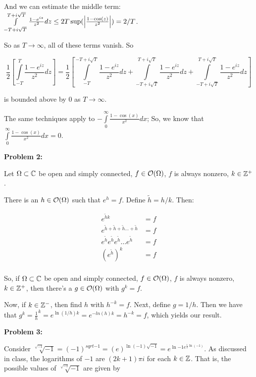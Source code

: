 \documentclass[a4paper,12pt]{article}
\begin{document}
And we can estimate the middle term: $\int\limits_{-T+i\sqrt{T}}^{T+i\sqrt{T}} \frac{1-e^{iz}}{z^2} dz \leq 2T \sup(\left\lvert \frac{1-\cos(z)}{z^2} \right\rvert) = 2/T$.

So as $T \to \infty$, all of these terms vanish. So 

\begin{displaymath}
\frac{1}{2}\left[\int\limits_{-T}^T \frac{1-e^{iz}}{z^2} dz \right] = \frac{1}{2}\left[\int\limits_{-T}^{-T+i\sqrt{T}} \frac{1-e^{iz}}{z^2} dz +\int\limits_{-T+i\sqrt{T}}^{T+i\sqrt{T}} \frac{1-e^{iz}}{z^2} dz + \int\limits_{-T+i\sqrt{T}}^{T+i\sqrt{T}} \frac{1-e^{iz}}{z^2} dz \right]
\end{displaymath} 

is bounded above by $0$ as $T \to \infty$.

The same techniques apply to $-\int\limits_0^\infty \frac{1-\cos(x)}{x^2} dx$; So, we know that $\int\limits_0^\infty \frac{1-\cos(x)}{x^2} dx = 0$.

\shunt

{\bf Problem 2:}

Let $\Omega \subset \mathbb{C}$ be open and simply connected, $f \in \mathcal{O} (\Omega)$, $f$ is always nonzero, $k \in \mathbb{Z}^+$.

There is an $h \in \mathcal{O}(\Omega)$ such that $e^h =f$. Define $\tilde{h} = h/k$. Then:

\begin{align*}
e^{\tilde{h}k} &= f\\
e^{\tilde{h}+\tilde{h}+\tilde{h} \ldots +\tilde{h}} &= f\\
e^{\tilde{h}}e^{\tilde{h}}e^{\tilde{h}} \ldots e^{\tilde{h}} &= f\\
(e^{\tilde{h}})^k &= f\\
\end{align*}

So, if $\Omega \subset \mathbb{C}$ be open and simply connected, $f \in \mathcal{O} (\Omega)$, $f$ is always nonzero, $k \in \mathbb{Z}^+$, then there's a $g \in \mathcal{O}(\Omega)$ with $g^k = f$.

Now, if $k \in \mathbb{Z}^-$, then find $h$ with $h^{-k} = f$. Next, define $g = 1/h$. Then we have that $g^k = \frac{1}{h}^k =e^{\ln(1/h)k} = e^{-ln(h)k}= h^{-k} = f$, which yields our result.

\shunt

{\bf Problem 3:}

Consider $\sqrt[\sqrt{-1}]{-1} = (-1)^{sqrt{-1}} = (e)^{\ln(-1)\sqrt{-1}} = e^{\ln{-1}e^{\frac{1}{2}\ln(-1)}}$. As discussed in class, the logarithms of $-1$ are $(2k+1)\pi i$ for each $k \in \mathbb{Z}$. That is, the possible values of $\sqrt[\sqrt{-1}]{-1}$ are given by 
\end{document}
